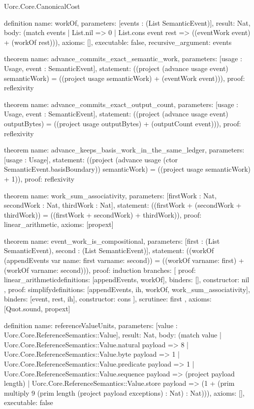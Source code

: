 \begin{lexlean}{Uorc.Core.CanonicalCost}
\begin{semanticmodule}
definition{
  name: workOf,
  parameters: [events : (List SemanticEvent)],
  result: Nat,
  body: (match events
    | List.nil => 0
    | List.cons event rest => ((eventWork event) + (workOf rest))),
  axioms: [],
  executable: false,
  recursive_argument: events
}

theorem{
  name: advance_commits_exact_semantic_work,
  parameters: [usage : Usage, event : SemanticEvent],
  statement: ((project (advance usage event) semanticWork) = ((project usage semanticWork) + (eventWork event))),
  proof: reflexivity{}
}

theorem{
  name: advance_commits_exact_output_count,
  parameters: [usage : Usage, event : SemanticEvent],
  statement: ((project (advance usage event) outputBytes) = ((project usage outputBytes) + (outputCount event))),
  proof: reflexivity{}
}

theorem{
  name: advance_keeps_basis_work_in_the_same_ledger,
  parameters: [usage : Usage],
  statement: ((project (advance usage (ctor SemanticEvent.basisBoundary)) semanticWork) = ((project usage semanticWork) + 1)),
  proof: reflexivity{}
}

theorem{
  name: work_sum_associativity,
  parameters: [firstWork : Nat, secondWork : Nat, thirdWork : Nat],
  statement: ((firstWork + (secondWork + thirdWork)) = ((firstWork + secondWork) + thirdWork)),
  proof: linear_arithmetic{},
  axioms: [propext]
}

theorem{
  name: event_work_is_compositional,
  parameters: [first : (List SemanticEvent), second : (List SemanticEvent)],
  statement: ((workOf (appendEvents var{
    name: first
  } var{name: second})) = ((workOf var{name: first}) + (workOf var{name: second}))),
  proof: induction{
    branches: [
      {
        proof: linear_arithmetic{definitions: [appendEvents, workOf]},
        binders: [],
        constructor: nil
      },
      {
        proof: simplify{definitions: [appendEvents, ih, workOf, work_sum_associativity]},
        binders: [event, rest, ih],
        constructor: cons
      }
    ],
    scrutinee: first
  },
  axioms: [Quot.sound, propext]
}

definition{
  name: referenceValueUnits,
  parameters: [value : Uorc.Core.ReferenceSemantics::Value],
  result: Nat,
  body: (match value
    | Uorc.Core.ReferenceSemantics::Value.natural payload => 8
    | Uorc.Core.ReferenceSemantics::Value.byte payload => 1
    | Uorc.Core.ReferenceSemantics::Value.predicate payload => 1
    | Uorc.Core.ReferenceSemantics::Value.sequence payload => (project payload length)
    | Uorc.Core.ReferenceSemantics::Value.store payload => (1 + (prim multiply 9 (prim length (project payload exceptions) : Nat) : Nat))),
  axioms: [],
  executable: false
}
\end{semanticmodule}
\end{lexlean}
